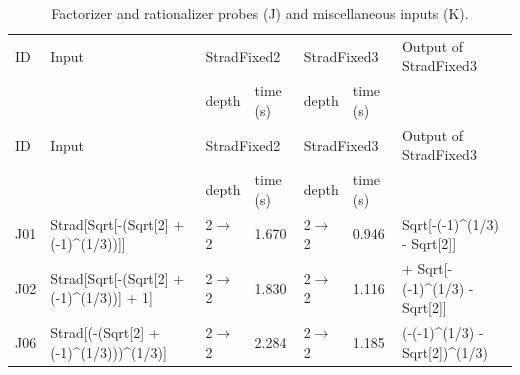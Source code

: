 \begin{longtable}{@{}p{}>{\ttfamily\footnotesize\raggedright\arraybackslash}p{}p{}p{}p{}p{}>{\ttfamily\footnotesize\raggedright\arraybackslash}p{}@{}}
\caption{Factorizer and rationalizer probes (J) and miscellaneous inputs (K).}\label{tab:cmpJK}\\
\toprule ID & Input & \multicolumn{2}{l}{StradFixed2} & \multicolumn{2}{l}{StradFixed3} & Output of StradFixed3\\ & & depth & time (s) & depth & time (s) & \\\midrule\endfirsthead
\toprule ID & Input & \multicolumn{2}{l}{StradFixed2} & \multicolumn{2}{l}{StradFixed3} & Output of StradFixed3\\ & & depth & time (s) & depth & time (s) & \\\midrule\endhead
\bottomrule\endfoot
J01 & Strad[\allowbreak{}Sqrt[\allowbreak{}-(\allowbreak{}Sqrt[\allowbreak{}2]\allowbreak{} +\allowbreak{} (\allowbreak{}-1)\allowbreak{}\textasciicircum{}\allowbreak{}(\allowbreak{}1/\allowbreak{}3)\allowbreak{})\allowbreak{}]\allowbreak{}]\allowbreak{} & 2$\to$2 & 1.670 & 2$\to$2 & 0.946 & Sqrt[\allowbreak{}-(\allowbreak{}-1)\allowbreak{}\textasciicircum{}\allowbreak{}(\allowbreak{}1/\allowbreak{}3)\allowbreak{} -\allowbreak{} Sqrt[\allowbreak{}2]\allowbreak{}]\allowbreak{}\\
J02 & Strad[\allowbreak{}Sqrt[\allowbreak{}-(\allowbreak{}Sqrt[\allowbreak{}2]\allowbreak{} +\allowbreak{} (\allowbreak{}-1)\allowbreak{}\textasciicircum{}\allowbreak{}(\allowbreak{}1/\allowbreak{}3)\allowbreak{})\allowbreak{}]\allowbreak{} +\allowbreak{} 1]\allowbreak{} & 2$\to$2 & 1.830 & 2$\to$2 & 1.116 & 1 +\allowbreak{} Sqrt[\allowbreak{}-(\allowbreak{}-1)\allowbreak{}\textasciicircum{}\allowbreak{}(\allowbreak{}1/\allowbreak{}3)\allowbreak{} -\allowbreak{} Sqrt[\allowbreak{}2]\allowbreak{}]\allowbreak{}\\
J06 & Strad[\allowbreak{}(\allowbreak{}-(\allowbreak{}Sqrt[\allowbreak{}2]\allowbreak{} +\allowbreak{} (\allowbreak{}-1)\allowbreak{}\textasciicircum{}\allowbreak{}(\allowbreak{}1/\allowbreak{}3)\allowbreak{})\allowbreak{})\allowbreak{}\textasciicircum{}\allowbreak{}(\allowbreak{}1/\allowbreak{}3)\allowbreak{}]\allowbreak{} & 2$\to$2 & 2.284 & 2$\to$2 & 1.185 & (\allowbreak{}-(\allowbreak{}-1)\allowbreak{}\textasciicircum{}\allowbreak{}(\allowbreak{}1/\allowbreak{}3)\allowbreak{} -\allowbreak{} Sqrt[\allowbreak{}2]\allowbreak{})\allowbreak{}\textasciicircum{}\allowbreak{}(\allowbreak{}1/\allowbreak{}3)\allowbreak{}\\

\end{longtable}
